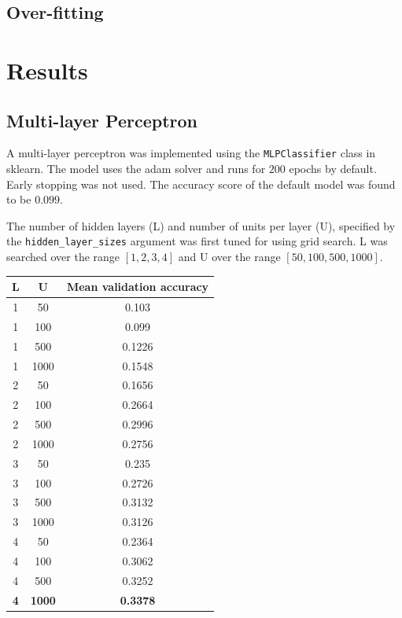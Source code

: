 \documentclass[12pt]{article}
\begin{document}
\subsection*{Over-fitting}

\section*{Results}

\subsection*{Multi-layer Perceptron}
A multi-layer perceptron was implemented using the \texttt{MLPClassifier} class in sklearn. The model uses the adam solver and runs for $200$ epochs by default. Early stopping was not used. The accuracy score of the default model was found to be $0.099$.

The number of hidden layers (L) and number of units per layer (U), specified by the \texttt{hidden\_layer\_sizes} argument was first tuned for using grid search. L was searched over the range $[1,2,3,4]$ and U over the range $[50,100,500,1000]$. 

\begin{center}
 \begin{tabular}{|c|c|c|}
  \hline
  L & U & Mean validation accuracy \\
  \hline
  1 & 50 & 0.103\\
  1 & 100 & 0.099\\
  1 & 500 & 0.1226\\
  1 & 1000 & 0.1548\\
  2 & 50 & 0.1656\\
  2 & 100 & 0.2664\\
  2 & 500 & 0.2996\\
  2 & 1000 & 0.2756\\ 
  3 & 50 & 0.235\\
  3 & 100 & 0.2726\\
  3 & 500 & 0.3132\\
  3 & 1000 & 0.3126\\ 
  4 & 50 & 0.2364\\
  4 & 100 & 0.3062\\
  4 & 500 & 0.3252\\
  \textbf{4} & \textbf{1000} & \textbf{0.3378}\\ 
  \hline
 \end{tabular}

\end{center}
\end{document}
